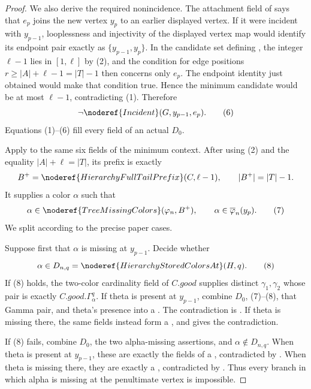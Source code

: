 \begin{proof}
We also derive the required nonincidence.  The attachment field of
 says that \(e_p\) joins the new vertex \(y_p\) to
an earlier displayed vertex.  If it were incident with \(y_{p-1}\),
looplessness and injectivity of the displayed vertex map would identify
its endpoint pair exactly as \(\{y_{p-1},y_p\}\).  In the candidate set
defining , the integer \(\ell-1\) lies in
\([1,\ell]\) by (2), and the condition for edge positions
\(r\ge|A|+\ell-1=|T|-1\) then concerns only \(e_p\).  The endpoint
identity just obtained would make that condition true.  Hence the minimum
candidate would be at most \(\ell-1\), contradicting (1).  Therefore
\[
                 \neg\noderef{Incident}(G,y_{p-1},e_p).      \tag{6}
\]
Equations (1)--(6) fill every field of an actual
 \(D_0\).

Apply  to the same
six fields of the minimum context.  After using (2) and the equality
\(|A|+\ell=|T|\), its prefix is exactly
\[
 B^+=\noderef{HierarchyFullTailPrefix}(C,\ell-1),
 \qquad |B^+|=|T|-1.
\]
It supplies a color \(\alpha\) such that
\[
 \alpha\in\noderef{TreeMissingColors}(\varphi_n,B^+),
 \qquad
 \alpha\in\overline\varphi_n(y_p).                           \tag{7}
\]
We split according to the precise paper cases.

Suppose first that \(\alpha\) is missing at \(y_{p-1}\).  Decide whether
\[
       \alpha\in
       D_{n,q}=\noderef{HierarchyStoredColorsAt}(H,q).        \tag{8}
\]
If (8) holds, the two-color cardinality field of
\(C.\mathit{good}\) supplies distinct
\(\gamma_1,\gamma_2\) whose pair is exactly
\(C.\mathit{good}.\Gamma^q_\alpha\).  If theta is present at
\(y_{p-1}\), combine \(D_0\), (7)--(8), that Gamma pair, and theta's
presence into a .  The
contradiction is .  If theta
is missing there, the same fields instead form a
, and
 gives the contradiction.

If (8) fails, combine \(D_0\), the two alpha-missing assertions, and
\(\alpha\notin D_{n,q}\).  When theta is present at \(y_{p-1}\), these
are exactly the fields of a
, contradicted by
.  When theta is missing
there, they are exactly a
, contradicted by
.  Thus every branch in which
alpha is missing at the penultimate vertex is impossible.


\end{proof}
